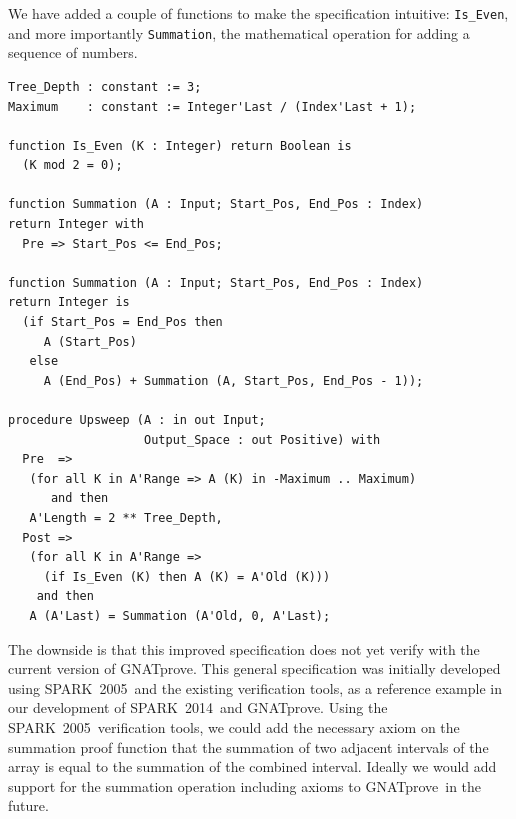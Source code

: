\documentclass[sttt,final]{svjour}
\newcommand{\gnatprove}{GNATprove\xspace}
\newcommand{\oldspark}{SPARK~2005\xspace}
\newcommand{\newspark}{SPARK~2014\xspace}
\begin{document}
We have added a couple of functions to make the specification
intuitive: \verb|Is_Even|, and more importantly \verb|Summation|, the
mathematical operation for adding a sequence of numbers.

\begin{lstlisting}
Tree_Depth : constant := 3;
Maximum    : constant := Integer'Last / (Index'Last + 1);

function Is_Even (K : Integer) return Boolean is
  (K mod 2 = 0);

function Summation (A : Input; Start_Pos, End_Pos : Index)
return Integer with
  Pre => Start_Pos <= End_Pos;

function Summation (A : Input; Start_Pos, End_Pos : Index)
return Integer is
  (if Start_Pos = End_Pos then
     A (Start_Pos)
   else
     A (End_Pos) + Summation (A, Start_Pos, End_Pos - 1));

procedure Upsweep (A : in out Input;
                   Output_Space : out Positive) with
  Pre  =>
   (for all K in A'Range => A (K) in -Maximum .. Maximum)
      and then
   A'Length = 2 ** Tree_Depth,
  Post =>
   (for all K in A'Range =>
     (if Is_Even (K) then A (K) = A'Old (K)))
    and then
   A (A'Last) = Summation (A'Old, 0, A'Last);
\end{lstlisting}

The downside is that this improved specification does not yet verify
with the current version of \gnatprove. This general specification was
initially developed using \oldspark\ and the existing verification
tools, as a reference example in our development of \newspark\ and
\gnatprove. Using the \oldspark\ verification tools, we could add the
necessary axiom on the summation proof function that the summation of
two adjacent intervals of the array is equal to the summation of the
combined interval. Ideally we would add support for the summation
operation including axioms to \gnatprove\ in the future.


\end{document}
